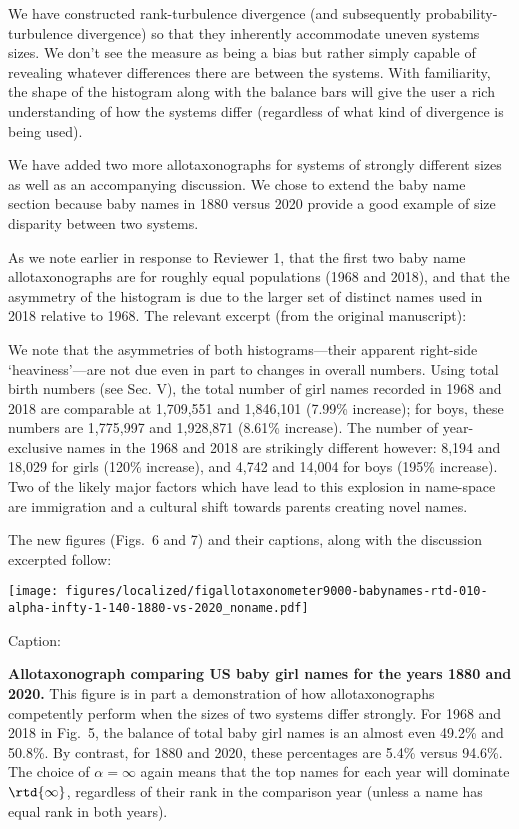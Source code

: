 We have constructed rank-turbulence divergence
(and subsequently probability-turbulence divergence)
so that they inherently accommodate uneven systems sizes.
We don't see the measure as being a bias but rather
simply capable of revealing whatever differences there
are between the systems.
With familiarity, the shape of the histogram along with the balance bars
will give the user a rich understanding of how the systems differ
(regardless of what kind of divergence is being used).

We have added two more allotaxonographs for systems of strongly different sizes
as well as an accompanying discussion.
We chose to extend the baby name section because baby names in 1880 versus 2020
provide a good example of size disparity between two systems.

As we note earlier in response to Reviewer 1,
that the first two baby name allotaxonographs are for roughly
equal populations (1968 and 2018), and that the asymmetry of the
histogram is due to the larger set of distinct names used in 2018 relative to 1968.
The relevant excerpt (from the original manuscript):

\begin{excerpt}
  We note that the asymmetries of both histograms---their apparent
  right-side `heaviness'---are not due even in part
  to changes in overall numbers.
  Using total birth numbers (see Sec. V),
  the total number of girl names recorded in 1968 and 2018
  are comparable at 1,709,551 and 1,846,101 (7.99\% increase);
  for boys, these numbers are 1,775,997 and 1,928,871 (8.61\% increase).
  The number of year-exclusive names in the 1968 and 2018
  are strikingly different however:
  8,194 and 18,029 for girls (120\% increase),
  and 4,742 and 14,004 for boys (195\% increase).
  Two of the likely major factors which have lead to this explosion in name-space
  are immigration and a cultural shift towards parents creating novel names.
\end{excerpt}

The new figures (Figs.~6 and 7) and their captions, along with the discussion excerpted follow:

\texttt{[image: figures/localized/figallotaxonometer9000-babynames-rtd-010-alpha-infty-1-140-1880-vs-2020\_noname.pdf]}

Caption:

\begin{excerpt}
  \textbf{Allotaxonograph comparing US baby girl names for the years 1880 and 2020.}
  This figure is in part
  a demonstration of how allotaxonographs
  competently perform when the sizes of two systems differ strongly.
  For 1968 and 2018 in Fig.~5,
  the balance of total baby girl names 
  is an almost even 49.2\% and 50.8\%.
  By contrast, for 1880 and 2020, these percentages are 5.4\% versus 94.6\%.
  The choice of $\alpha=\infty$ again means that the top names for each year will
  dominate $\rtd{\infty}$, regardless of their rank in the comparison year
  (unless a name has equal rank in both years).
\end{excerpt}


